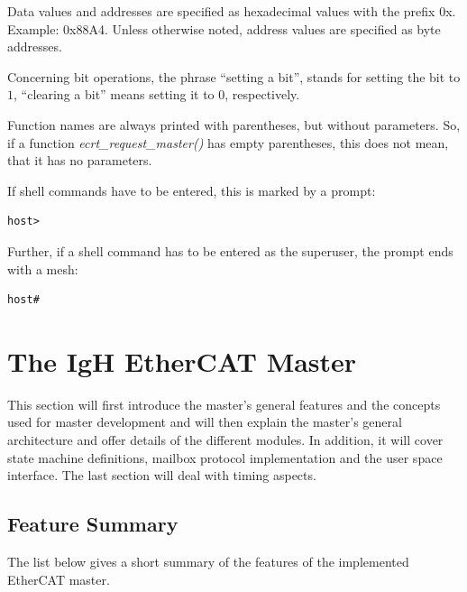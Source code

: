\documentclass[a4paper,12pt,BCOR6mm,bibtotoc,idxtotoc]{scrbook}
\begin{document}
Data values and addresses are specified as hexadecimal values with the
prefix 0x. Example: 0x88A4. Unless otherwise noted, address values are
specified as byte addresses.

Concerning bit operations, the phrase ``setting a bit'', stands for
setting the bit to $1$, ``clearing a bit'' means setting it to $0$,
respectively.

Function names are always printed with parentheses, but without
parameters. So, if a function \textit{ecrt\_request\_master()} has
empty parentheses, this does not mean, that it has no parameters.

If shell commands have to be entered, this is marked by a prompt:

\begin{lstlisting}[gobble=2]
  host>
\end{lstlisting}

Further, if a shell command has to be entered as the superuser, the
prompt ends with a mesh:

\begin{lstlisting}[gobble=2]
  host#
\end{lstlisting}


\chapter{The IgH EtherCAT Master}
\label{chapter:master}

This section will first introduce the master's general features and
the concepts used for master development and will then explain the
master's general architecture and offer details of the different
modules. In addition, it will cover state machine definitions, mailbox
protocol implementation and the user space interface. The last section
will deal with timing aspects.


\section{Feature Summary}
\label{sec:summary}

The list below gives a short summary of the features of the
implemented EtherCAT master.
\end{document}
